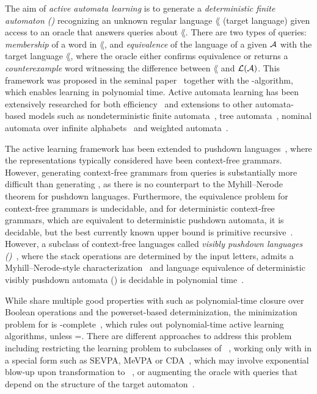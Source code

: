 The aim of \emph{active automata learning} is to generate a \emph{deterministic finite automaton (\DFA)} recognizing an unknown regular language 
$\lang$ (target language)
given access to an oracle that answers queries about $\lang$.
There are two types of queries: 
\emph{membership} of a word in $\lang$, and 
\emph{equivalence} of the language of a given \DFA $\mathcal{A}$ with the target language $\lang$,
where the oracle either confirms equivalence or returns a \emph{counterexample} word witnessing the difference between $\lang$ and $\mathcal{L}(\mathcal{A})$.
This framework was proposed in the seminal paper~\cite{angluin1987learning} together with the \lStar-algorithm, 
which enables learning in polynomial time. 
Active automata learning has been extensively researched 
for both efficiency~\cite{TTTalgorithm,Lsharp} and extensions to other automata-based models such as
nondeterministic finite automata~\cite{BolligHKL09}, tree automata~\cite{DBLP:conf/dlt/DrewesH03}, nominal automata over infinite alphabets~\cite{MoermanS0KS17} 
and weighted automata~\cite{activeWeightedAutomata}.

The active learning framework has been extended to pushdown languages~\cite{Knobe76,Angluin95,GrammaticalInference,DBLP:conf/pldi/Bastani0AL17,DBLP:conf/kbse/KulkarniLS21}, 
where the representations typically considered have been context-free grammars.
However, 
generating context-free grammars from queries is substantially more difficult than generating \DFA, as there is no counterpart to 
the Myhill--Nerode theorem for pushdown languages. 
Furthermore, the equivalence problem for context-free grammars is undecidable, and 
for deterministic context-free grammars, which are equivalent to deterministic pushdown automata, it is decidable, but
the best currently known upper bound is primitive recursive~\cite{DBLP:conf/icalp/Senizergues97,DBLP:journals/jcss/Jancar21}. 
However, a subclass of context-free languages called \emph{visibly pushdown languages (\VPLs)}~\cite{InputDrivenPDA,DBLP:conf/stoc/AlurM04}, where the stack operations are determined by the input letters, 
admits a Myhill--Nerode-style characterization~\cite{alur2005congruences} and 
language equivalence of deterministic visibly pushdown automata (\DVPA) is decidable in polynomial time~\cite{DBLP:conf/stoc/AlurM04}.

While \DVPA share multiple good properties with \DFA such as polynomial-time closure over Boolean operations and the powerset-based determinization, 
the minimization problem for \DVPA is \NP-complete~\cite{DBLP:journals/lmcs/GauwinMR19}, which
rules out polynomial-time active learning algorithms, unless \PTIME=\NP.
There are different approaches to address this problem including 
restricting the learning problem to subclasses of \DVPA~\cite{DBLP:conf/concur/KumarMV06},
working only with \DVPA in a special form such as 
SEVPA, MeVPA or CDA~\cite{DBLP:phd/dnb/Isberner15, ValidatingXMLwithVPA,DBLP:journals/pacmpl/JiaT24}, 
which may involve exponential blow-up upon transformation to \DVPA~\cite{alur2005congruences}, or
augmenting the oracle with queries that depend on the structure of the target automaton~\cite{mfcs22}.

